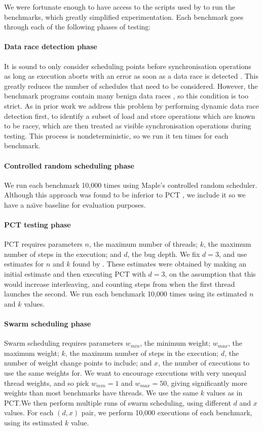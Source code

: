 We were fortunate enough to have access to the scripts used
by \cite{thomson2016,thomson2014} to run the benchmarks, which greatly
simplified experimentation.  Each benchmark goes through each of the
following phases of testing:

\paragraph{Data race detection phase}
It is sound to only consider scheduling points before synchronisation operations
as long as execution aborts with an error as soon as a data race is
detected \parencite{musuvathi2008}.  This greatly reduces the number of schedules that
need to be considered.  However, the benchmark programs contain many benign data
races \parencite{thomson2016}, so this condition is too strict.  As in prior
work \parencite{thomson2016,thomson2014,yu2012} we address this problem by performing
dynamic data race detection first, to identify a subset of load and store
operations which are known to be racey, which are then treated as visible
synchronisation operations during testing.  This process is nondeterministic, so
we run it ten times for each benchmark.

\paragraph{Controlled random scheduling phase}
We run each benchmark 10,000 times using Maple's controlled random scheduler.  Although
this approach was found to be inferior to PCT \parencite{thomson2016}, we include it
so we have a na\"{\i}ve baseline for evaluation purposes.

\paragraph{PCT testing phase}
PCT requires parameters $n$, the maximum number of threads; $k$, the maximum
number of steps in the execution; and $d$, the bug depth.  We fix $d=3$, and use
estimates for $n$ and $k$ found by \cite{thomson2016}.  These estimates were
obtained by making an initial estimate and then executing PCT with $d=3$, on the
assumption that this would increase interleaving, and counting steps from when
the first thread launches the second.  We run each benchmark 10,000 times using
its estimated $n$ and $k$ values.

\paragraph{Swarm scheduling phase}
Swarm scheduling requires parameters $w_{min}$, the minimum weight; $w_{max}$,
the maximum weight; $k$, the maximum number of steps in the execution; $d$, the
number of weight change points to include; and $x$, the number of executions to
use the same weights for.  We want to encourage executions with very unequal
thread weights, and so pick $w_{min}=1$ and $w_{max}=50$, giving significantly
more weights than most benchmarks have threads.  We use the same $k$ values as
in PCT.\@ We then perform multiple runs of swarm scheduling, using different $d$
and $x$ values.  For each $(d, x)$ pair, we perform 10,000 executions of each
benchmark, using its estimated $k$ value.

